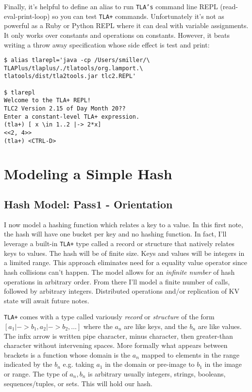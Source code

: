 \documentclass[twocolumn]{article}
\begin{document}
Finally, it's helpful to define an alias to run \texttt{TLA's} command line REPL (read-eval-print-loop) so you can test \texttt{TLA+} commands. Unfortunately it's not as powerful as a Ruby or Python REPL where it can deal with variable assignments. It only works over constants and operations on constants. However, it beats writing a throw away specification whose side effect is test and print: 

\begin{verbatim}
$ alias tlarepl='java -cp /Users/smiller/\
TLAPlus/tlaplus/./tlatools/org.lamport.\
tlatools/dist/tla2tools.jar tlc2.REPL'

$ tlarepl
Welcome to the TLA+ REPL!
TLC2 Version 2.15 of Day Month 20??
Enter a constant-level TLA+ expression.
(tla+) [ x \in 1..2 |-> 2*x]
<<2, 4>>
(tla+) <CTRL-D>
\end{verbatim}

\section{Modeling a Simple Hash}

\subsection{Hash Model: Pass1 - Orientation}
I now model a hashing function which relates a key to a value. In this first note, the hash will have one bucket per key and no hashing function. In fact, I'll leverage a built-in \texttt{TLA+} type called a record or structure that natively relates keys to values. The hash will be of finite size. Keys and values will be integers in a limited range. This approach eliminates need for a equality value operator since hash collisions can't happen. The model allows for an \emph{infinite number} of hash operations in arbitrary order. From there I'll model a finite number of calls, followed by arbitrary integers. Distributed operations and/or replication of KV state will await future notes.

\texttt{TLA+} comes with a type called variously \emph{record} or \emph{structure} of the form $[a_1 | -> b_1, a_2 | -> b_2, \ldots]$ where the $a_n$ are like keys, and the $b_n$ are like values. The infix arrow is written pipe character, minus character, then greater-than character without intervening spaces. More formally what appears between brackets is a function whose domain is the $a_n$ mapped to elements in the range indicated by the $b_n$ e.g. taking $a_1$ in the domain or pre-image to $b_1$ in the image or range. The type of $a_n, b_n$ is arbitrary usually integers, strings, booleans, sequences/tuples, or sets. This will hold our hash. 
\end{document}

